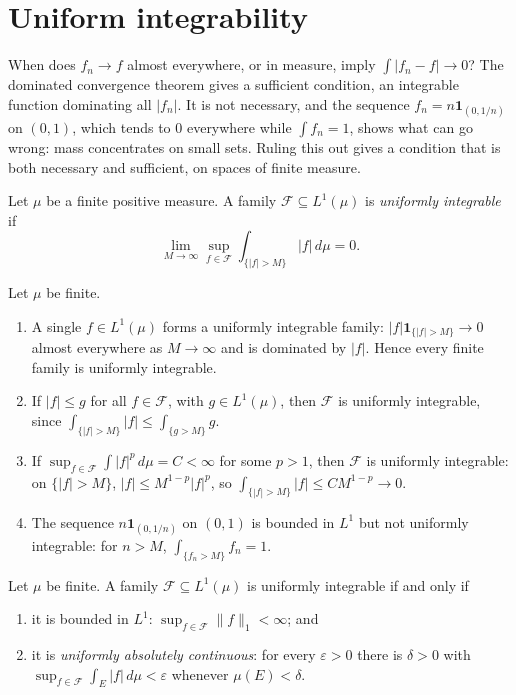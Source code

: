 \section{Uniform integrability}\label{signed-measures:section-uniform-integrability}

When does $f_n \to f$ almost everywhere, or in measure, imply $\int|f_n - f| \to 0$? The dominated convergence theorem gives a sufficient condition, an integrable function dominating all $|f_n|$. It is
not necessary, and the sequence $f_n = n\mathbf{1}_{(0, 1/n)}$ on $(0, 1)$, which tends to $0$ everywhere while $\int f_n = 1$, shows what can go wrong: mass concentrates on small sets. Ruling this out
gives a condition that is both necessary and sufficient, on spaces of finite measure.

\begin{definition}\label{signed-measures:definition-uniformly-integrable}
Let $\mu$ be a finite positive measure. A family $\mathcal{F} \subseteq L^1(\mu)$ is \emph{uniformly integrable} if
\[
\lim_{M \to \infty}\sup_{f \in \mathcal{F}}\int_{\{|f| > M\}}|f|\,d\mu = 0 .
\]
\end{definition}

\begin{example}\label{signed-measures:example-uniformly-integrable}
Let $\mu$ be finite.
\begin{enumerate}
\item A single $f \in L^1(\mu)$ forms a uniformly integrable family: $|f|\mathbf{1}_{\{|f| > M\}} \to 0$ almost everywhere as $M \to \infty$ and is dominated by $|f|$. Hence every finite family is uniformly
integrable.
\item If $|f| \leq g$ for all $f \in \mathcal{F}$, with $g \in L^1(\mu)$, then $\mathcal{F}$ is uniformly integrable, since $\int_{\{|f| > M\}}|f| \leq \int_{\{g > M\}}g$.
\item If $\sup_{f \in \mathcal{F}}\int|f|^p\,d\mu = C < \infty$ for some $p > 1$, then $\mathcal{F}$ is uniformly integrable: on $\{|f| > M\}$, $|f| \leq M^{1-p}|f|^p$, so
$\int_{\{|f| > M\}}|f| \leq CM^{1-p} \to 0$.
\item The sequence $n\mathbf{1}_{(0, 1/n)}$ on $(0, 1)$ is bounded in $L^1$ but not uniformly integrable: for $n > M$, $\int_{\{f_n > M\}}f_n = 1$.
\end{enumerate}
\end{example}

\begin{proposition}\label{signed-measures:proposition-uniformly-integrable}
Let $\mu$ be finite. A family $\mathcal{F} \subseteq L^1(\mu)$ is uniformly integrable if and only if
\begin{enumerate}
\item it is bounded in $L^1$: $\sup_{f \in \mathcal{F}}\|f\|_1 < \infty$; and
\item it is \emph{uniformly absolutely continuous}: for every $\varepsilon > 0$ there is $\delta > 0$ with $\sup_{f \in \mathcal{F}}\int_E|f|\,d\mu < \varepsilon$ whenever $\mu(E) < \delta$.
\end{enumerate}
\end{proposition}

